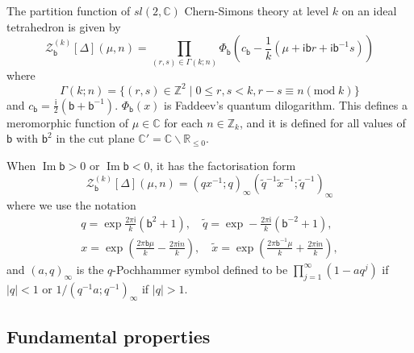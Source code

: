 \documentclass[a4paper,11pt]{article}	%
\DeclareMathOperator{\imag}{Im}
\def\mc{\mathcal}
\def\ms{\mathsf}
\def\IC{\mathbb{C}}
\def\IR{\mathbb{R}}
\def\IZ{\mathbb{Z}}
\def\tq{\tilde{q}}
\def\tx{\tilde{x}}
\newcommand{\ri}{{\mathsf{i}}}
\newcommand{\bb}{\ms{b}}
\begin{document}
The partition function of $sl(2,\IC)$ Chern-Simons theory at level $k$
on an ideal tetrahedron is given by
\begin{equation}
  \mc{Z}_\bb^{(k)}[\Delta](\mu,n) = \prod_{(r,s)\in \Gamma(k;n)}\Phi_\bb(c_\bb
  -\frac{1}{k}(\mu+\ri \bb r + \ri\bb^{-1}s))
\end{equation}
where
\begin{equation}
  \Gamma(k;n) = \{(r,s)\in\IZ^2\;|\; 0\leq r,s<k, r-s \equiv n
  (\text{mod}\;k)\}
\end{equation}
and $c_\bb = \frac{\ri}{2}(\bb+\bb^{-1})$.
$\Phi_\bb(x)$ is Faddeev's quantum dilogarithm.
This defines a meromorphic
function of $\mu\in\IC$ for each $n\in\IZ_k$, and it is defined for
all values of $\bb$ with $\bb^2$ in the cut plane
$\IC' = \IC\backslash \IR_{\leq 0}$.

When $\imag \bb >0$ or $\imag\bb <0$, it has the factorisation form
\begin{equation}
  \mc{Z}_\bb^{(k)}[\Delta](\mu,n) = (qx^{-1};q)_\infty (\tq^{-1}\tx^{-1};\tq^{-1})_\infty
\end{equation}
where we use the notation
\begin{equation}
  \begin{gathered}
    q = \exp \frac{2\pi\ri}{k}(\bb^2+1),\quad \tq = \exp
    -\frac{2\pi\ri}{k}(\bb^{-2}+1),\\
    x = \exp \left(\frac{2\pi\bb\mu}{k} - \frac{2\pi\ri n}{k}\right),\quad
    \tx = \exp \left(\frac{2\pi\bb^{-1}\mu}{k} + \frac{2\pi\ri n}{k}\right),
  \end{gathered}
\end{equation}
and $(a,q)_\infty$ is the $q$-Pochhammer symbol defined to be
$\prod_{j=1}^\infty(1-a q^j)$ if $|q|<1$ or
$1/(q^{-1}a;q^{-1})_\infty$ if $|q|>1$.

\subsection{Fundamental properties}
\end{document}
